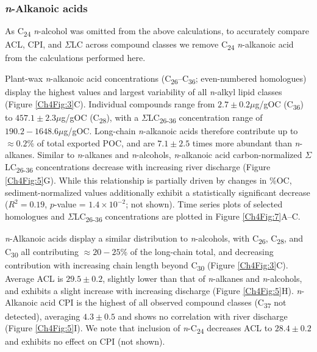 \subsubsection{\textit{n}-Alkanoic acids}

As C\textsubscript{24} \textit{n}-alcohol was omitted from the above calculations, to accurately compare ACL, CPI, and $\Sigma$LC across compound classes we remove C\textsubscript{24} \textit{n}-alkanoic acid from the calculations performed here.

Plant-wax \textit{n}-alkanoic acid concentrations (C\textsubscript{26}--C\textsubscript{36}; even-numbered homologues) display the highest values and largest variability of all \textit{n}-alkyl lipid classes (Figure \ref{Ch4Fig:3}C). Individual compounds range from $2.7 \pm 0.2 \mu$g/gOC (C\textsubscript{36}) to $457.1 \pm 2.3 \mu$g/gOC (C\textsubscript{28}), with a $\Sigma$LC\textsubscript{26-36} concentration range of $190.2 - 1648.6 \mu$g/gOC. Long-chain \textit{n}-alkanoic acids therefore contribute up to $\approx 0.2$\% of total exported POC, and are $7.1 \pm 2.5$ times more abundant than \textit{n}-alkanes. Similar to \textit{n}-alkanes and \textit{n}-alcohols, \textit{n}-alkanoic acid carbon-normalized $\Sigma$LC\textsubscript{26-36} concentrations decrease with increasing river discharge (Figure \ref{Ch4Fig:5}G). While this relationship is partially driven by changes in \%OC, sediment-normalized values additionally exhibit a statistically significant decrease ($R^2 = 0.19$, $p$-value = $1.4 \times 10^{-2}$; not shown). Time series plots of selected homologues and $\Sigma$LC\textsubscript{26-36} concentrations are plotted in Figure \ref{Ch4Fig:7}A--C.

\textit{n}-Alkanoic acids display a similar distribution to \textit{n}-alcohols, with C\textsubscript{26}, C\textsubscript{28}, and C\textsubscript{30} all contributing $\approx 20 - 25$\% of the long-chain total, and decreasing contribution with increasing chain length beyond C\textsubscript{30} (Figure \ref{Ch4Fig:3}C). Average ACL is $29.5 \pm 0.2$, slightly lower than that of \textit{n}-alkanes and \textit{n}-alcohols, and exhibits a slight increase with increasing discharge (Figure \ref{Ch4Fig:5}H). \textit{n}-Alkanoic acid CPI is the highest of all observed compound classes (C\textsubscript{37} not detected), averaging $4.3 \pm 0.5$ and shows no correlation with river discharge (Figure \ref{Ch4Fig:5}I). We note that inclusion of \textit{n}-C\textsubscript{24} decreases ACL to $28.4 \pm 0.2$ and exhibits no effect on CPI (not shown).

